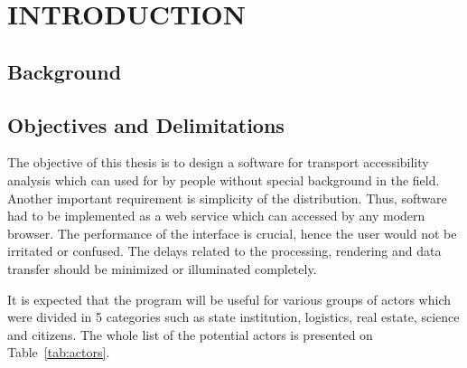 \section{INTRODUCTION}

\subsection{Background}

\subsection{Objectives and Delimitations}
The objective of this thesis is to design a software for transport accessibility analysis
which can used for by people without special background in the field. Another important
requirement is simplicity of the distribution. Thus, software had to be implemented
as a web service which can accessed by any modern browser. The performance of the interface
is crucial, hence the user would not be irritated or confused. The delays related to the processing,
rendering and data transfer should be minimized or illuminated completely.

It is expected that the program will be useful for various groups of actors which
were divided in 5 categories such as state institution, logistics, real estate, science
and citizens. The whole list of the potential actors is presented on Table~\ref{tab:actors}.


